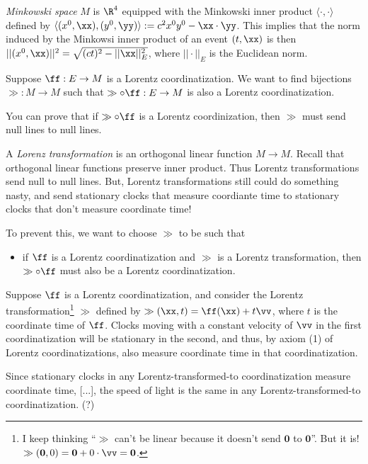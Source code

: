 \vspace{.5cm}

\textit{Minkowski space} $M$ is $\R^4$ equipped with the Minkowski inner product $\langle \cdot, \cdot \rangle$ defined by ${\langle (x^0, \xx), (y^0, \yy) \rangle := c^2 x^0 y^0 - \xx \cdot \yy}$. This implies that the norm induced by the Minkowsi inner product of an event $(t, \xx)$ is then ${||(x^0, \xx)||^2 = \sqrt{(ct)^2 - ||\xx||_E^2}}$, where $||\cdot||_E$ is the Euclidean norm.

Suppose $\ff:E \rightarrow M$ is a Lorentz coordinatization. We want to find bijections $\gg:M \rightarrow M$ such that $\gg \circ \ff:E \rightarrow M$ is also a Lorentz coordinatization.

You can prove that if $\gg \circ \ff$ is a Lorentz coordinization, then $\gg$ must send null lines to null lines.

\vspace{.5cm}

A \textit{Lorenz transformation} is an orthogonal linear function $M \rightarrow M$. Recall that orthogonal linear functions preserve inner product. Thus Lorentz transformations send null to null lines. But, Lorentz transformations still could do something nasty, and send stationary clocks that measure coordiante time to stationary clocks that don't measure coordinate time!

To prevent this, we want to choose $\gg$ to be such that

\begin{itemize}
	\item if $\ff$ is a Lorentz coordinatization and $\gg$ is a Lorentz transformation, then $\gg \circ \ff$ must also be a Lorentz coordinatization.
\end{itemize}

Suppose $\ff$ is a Lorentz coordinatization, and consider the Lorentz transformation\footnote{I keep thinking ``$\gg$ can't be linear because it doesn't send $\mathbf{0}$ to $\mathbf{0}$''. But it is! $\gg(\mathbf{0}, 0) = \mathbf{0} + 0 \cdot \vv = \mathbf{0}$.} $\gg$ defined by ${\gg(\xx, t) = \ff(\xx) + t \vv}$, where $t$ is the coordinate time of $\ff$. Clocks moving with a constant velocity of $\vv$ in the first coordinatization will be stationary in the second, and thus, by axiom (1) of Lorentz coordinatizations, also measure coordinate time in that coordinatization.

Since stationary clocks in any Lorentz-transformed-to coordinatization measure coordinate time, [...], the speed of light is the same in any Lorentz-transformed-to coordinatization. (?)

